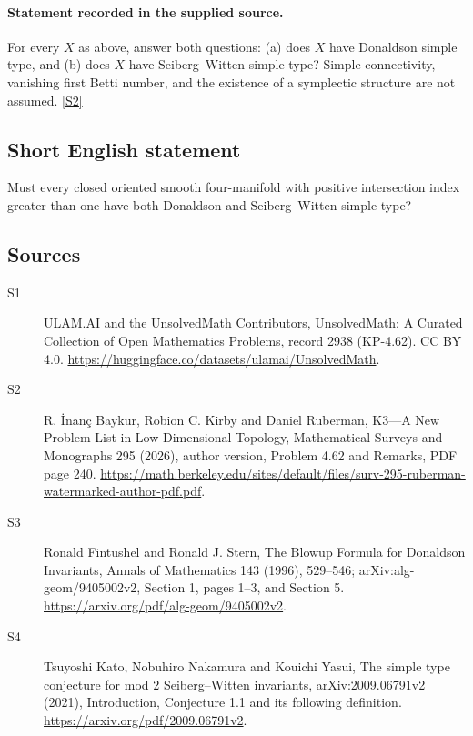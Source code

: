 \documentclass[11pt]{article}
\newcommand{\sref}[2]{\hyperlink{source:#1:#2}{[S#2]}}
\begin{document}
\paragraph{Statement recorded in the supplied source.}
For every $X$ as above, answer both questions: (a) does $X$ have Donaldson simple type, and (b) does $X$ have Seiberg--Witten simple type? Simple connectivity, vanishing first Betti number, and the existence of a symplectic structure are not assumed. \sref{2938}{2}
\subsection{Short English statement}
Must every closed oriented smooth four-manifold with positive intersection index greater than one have both Donaldson and Seiberg–Witten simple type?
\subsection{Sources}
\begin{description}
\item[\hypertarget{source:2938:1}{S1}] ULAM.AI and the UnsolvedMath Contributors, UnsolvedMath: A Curated Collection of Open Mathematics Problems, record 2938 (KP-4.62). CC BY 4.0. \url{https://huggingface.co/datasets/ulamai/UnsolvedMath}.
\item[\hypertarget{source:2938:2}{S2}] R. İnanç Baykur, Robion C. Kirby and Daniel Ruberman, K3—A New Problem List in Low-Dimensional Topology, Mathematical Surveys and Monographs 295 (2026), author version, Problem 4.62 and Remarks, PDF page 240. \url{https://math.berkeley.edu/sites/default/files/surv-295-ruberman-watermarked-author-pdf.pdf}.
\item[\hypertarget{source:2938:3}{S3}] Ronald Fintushel and Ronald J. Stern, The Blowup Formula for Donaldson Invariants, Annals of Mathematics 143 (1996), 529--546; arXiv:alg-geom/9405002v2, Section 1, pages 1--3, and Section 5. \url{https://arxiv.org/pdf/alg-geom/9405002v2}.
\item[\hypertarget{source:2938:4}{S4}] Tsuyoshi Kato, Nobuhiro Nakamura and Kouichi Yasui, The simple type conjecture for mod 2 Seiberg–Witten invariants, arXiv:2009.06791v2 (2021), Introduction, Conjecture 1.1 and its following definition. \url{https://arxiv.org/pdf/2009.06791v2}.
\end{description}
\label{end:2938}
\end{document}
